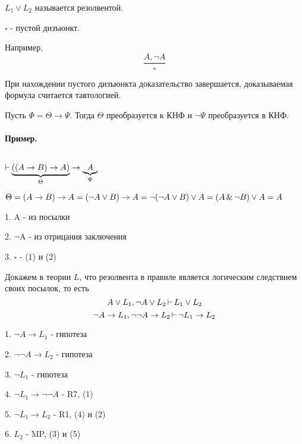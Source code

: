 $L_1 \lor L_2$ называется резолвентой.

\medskip

$\square$ - пустой дизъюнкт.

Например,
 \[
\frac{A, \lnot A}{\square}
\] 

При нахождении пустого дизъюнкта доказательство завершается, доказываемая формула считается тавтологией.

\medskip

Пусть $\Phi = \Theta \to \Psi$. Тогда $\Theta$ преобразуется к КНФ и  $\lnot\Psi$ преобразуется в КНФ.

\paragraph*{Пример.} ${}$ \newline

$\operatorname{\vdash} \underbrace{((A \to B) \to A)}_{\Theta} \to \underbrace{A}_{\Psi}$

$\Theta =
(A \to B) \to A = (\lnot A \lor B) \to A = \lnot (\lnot A \lor B) \lor A = (A \operatorname{\&} \lnot B) \lor A = A$

1. A - из посылки

2. $\lnot$A - из отрицания заключения

3.  $\square$ - (1) и (2)

\medskip

Докажем в теории $L$, что резолвента в правиле является логическим следствием своих посылок, то есть
\[
A \lor L_1, \lnot A \lor L_2 \operatorname{\vdash} L_1 \lor L_2
\] 
\[
\lnot A \to  L_1, \lnot\lnot A \to  L_2 \operatorname{\vdash} \lnot L_1 \to L_2
\] 

1. $\lnot A \to L_1$ - гипотеза

2. $\lnot\lnot A \to L_2$ - гипотеза

3. $\lnot L_1$ - гипотеза

4. $\lnot L_1 \to \lnot\lnot A$ - R7, (1)

5. $\lnot L_1 \to L_2$ - R1, (4) и (2)

6. $L_2$ - MP, (3) и (5)


